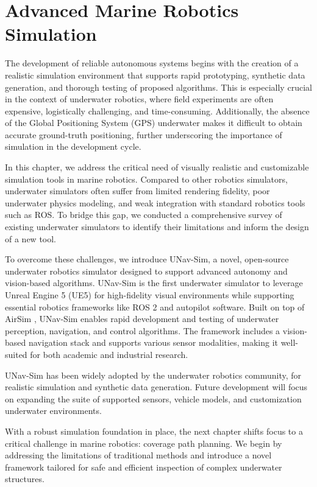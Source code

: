 \chapter{Advanced Marine Robotics Simulation}
\label{ch:simulator}
The development of reliable autonomous systems begins with the creation of a realistic simulation environment that supports rapid prototyping, synthetic data generation, and thorough testing of proposed algorithms. This is especially crucial in the context of underwater robotics, where field experiments are often expensive, logistically challenging, and time-consuming. Additionally, the absence of the Global Positioning System (GPS) underwater makes it difficult to obtain accurate ground-truth positioning, further underscoring the importance of simulation in the development cycle.


In this chapter, we address the critical need of visually realistic and customizable simulation tools in marine robotics. Compared to other robotics simulators, underwater simulators often suffer from limited rendering fidelity, poor underwater physics modeling, and weak integration with standard robotics tools such as ROS. To bridge this gap, we conducted a comprehensive survey of existing underwater simulators to identify their limitations and inform the design of a new tool.

To overcome these challenges, we introduce UNav-Sim, a novel, open-source underwater robotics simulator designed to support advanced autonomy and vision-based algorithms. UNav-Sim is the first underwater simulator to leverage Unreal Engine 5 (UE5) \cite{unreal} for high-fidelity visual environments while supporting essential robotics frameworks like ROS 2 and autopilot software. Built on top of AirSim \cite{airsim}, UNav-Sim enables rapid development and testing of underwater perception, navigation, and control algorithms. The framework includes a vision-based navigation stack and supports various sensor modalities, making it well-suited for both academic and industrial research. %




UNav-Sim has been widely adopted by the underwater robotics community, for realistic simulation and synthetic data generation. Future development will focus on expanding the suite of supported sensors, vehicle models, and customization underwater environments. 

With a robust simulation foundation in place, the next chapter shifts focus to a critical challenge in marine robotics: coverage path planning. We begin by addressing the limitations of traditional methods and introduce a novel framework tailored for safe and efficient inspection of complex underwater structures.